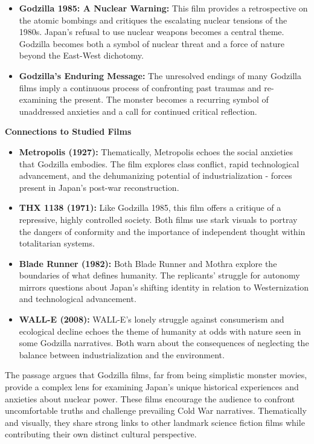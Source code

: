 \documentclass[11pt,fleqn]{book} %
\begin{document}
\begin{itemize}
\item \textbf{Godzilla 1985: A Nuclear Warning:}  This film provides a retrospective on the atomic bombings and critiques the escalating nuclear tensions of the 1980s. Japan's refusal to use nuclear weapons becomes a central theme. Godzilla becomes both a symbol of nuclear threat and a force of nature beyond the East-West dichotomy.

\item \textbf{Godzilla's Enduring Message:} The unresolved endings of many Godzilla films imply a continuous process of confronting past traumas and re-examining the present. The monster becomes a recurring symbol of unaddressed anxieties and a call for continued critical reflection. 
\end{itemize}
\vspace{5pt}

\textbf{Connections to Studied Films}

\begin{itemize}
\item \textbf{Metropolis (1927):} Thematically, Metropolis echoes the social anxieties that Godzilla embodies. The film explores class conflict, rapid technological advancement, and the dehumanizing potential of industrialization - forces present in Japan's post-war reconstruction.  

\item \textbf{THX 1138 (1971):}  Like Godzilla 1985, this film offers a critique of a repressive, highly controlled society. Both films use stark visuals to portray the dangers of conformity and the importance of independent thought within totalitarian systems.

\item \textbf{Blade Runner (1982):}  Both Blade Runner and Mothra explore the boundaries of what defines humanity. The replicants' struggle for autonomy mirrors questions about Japan's shifting identity in relation to Westernization and technological advancement. 

\item \textbf{WALL-E (2008):}   WALL-E's lonely struggle against consumerism and ecological decline echoes the theme of humanity at odds with nature seen in some Godzilla narratives. Both warn about the consequences of neglecting the balance between industrialization and the environment.
\end{itemize}

\vspace{5pt}

The passage argues that Godzilla films, far from being simplistic monster movies, provide a complex lens for examining Japan's unique historical experiences and anxieties about nuclear power. These films encourage the audience to confront uncomfortable truths and challenge prevailing Cold War narratives. Thematically and visually, they share strong links to other landmark science fiction films while contributing their own distinct cultural perspective. 
\end{document}
